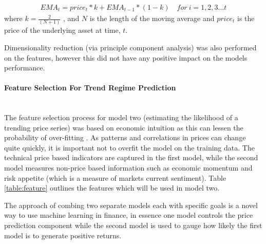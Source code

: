 \documentclass[11pt]{article}
\newcommand{\myparagraph}[1]{\paragraph{#1}\mbox{}\\}
\begin{document}
\begin{align}
EMA_{t} = price_{t}*k + EMA_{t-1}*(1-k) \quad for \ i = 1,2,3...t
\end{align}
where $k = \frac{2}{(N+1)}$ , and $N$ is the length of the moving average and $price_{t}$ is the price of the underlying asset at time, $t$.\par 
Dimensionality reduction (via principle component analysis) was also performed on the features, however this did not have any positive impact on the models performance.
\myparagraph{Feature Selection For Trend Regime Prediction}
The feature selection process for model two (estimating the likelihood of a trending price series) was based on economic intuition as this can lessen the probability of over-fitting \cite{Arnott2018}. As patterns and correlations in prices can change quite quickly, it is important not to overfit the model on the training data.  The technical price based indicators are captured in the first model, while the second model measures non-price based information such as economic momentum and risk appetite (which is a measure of markets current sentiment). 
Table \ref{table:feature} outlines the features which will be used in model two.
\begin{table}[h] 
\centering      %
\caption{Model Two: Trend Strength Estimation} %
\label{table:feature2} %
\end{table} 

The approach of combing two separate models each with specific goals is a novel way to use machine learning in finance, in essence one model controls the price prediction component while the second model is used to gauge how likely the first model is to generate positive returns.
\end{document}
